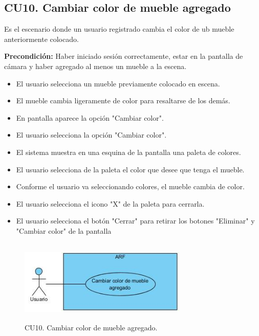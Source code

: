 \subsection{CU10. Cambiar color de mueble agregado}\par
Es el escenario donde un usuario registrado cambia el color de ub mueble anteriormente colocado.\par
\textbf{Precondición:} Haber iniciado sesión correctamente, estar en la pantalla de cámara y haber agregado al menos un mueble a la escena.\par
\begin{itemize}
	\item El usuario selecciona un mueble previamente colocado en escena.
	\item El mueble cambia ligeramente de color para resaltarse de los demás.
	\item En pantalla aparece la opción "Cambiar color".
	\item El usuario selecciona la opción "Cambiar color".
	\item El sistema muestra en una esquina de la pantalla una paleta de colores.
	\item El usuario selecciona de la paleta el color que desee que tenga el mueble.
	\item Conforme el usuario va seleccionando colores, el mueble cambia de color.
	\item El usuario selecciona el icono "X" de la paleta para cerrarla.
	\item El usuario selecciona el botón "Cerrar" para retirar los botones "Eliminar" y "Cambiar color" de la pantalla
\end{itemize}

\begin{figure}[h!]
	\centering
	\includegraphics[width=8cm,height=4cm]{imagenes/analisis/cu/cambiar_color.jpg}
	\caption{CU10. Cambiar color de mueble agregado.}
	\label{fig:cambiarcolor}
\end{figure} 

